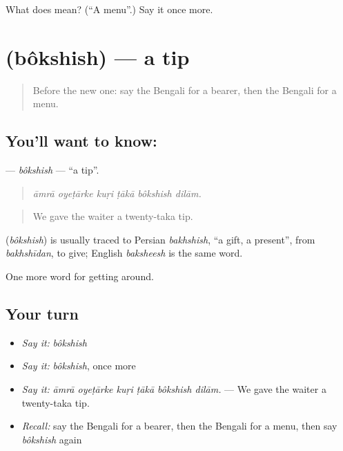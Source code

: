 \begin{tcolorbox}[breakable,colback=teal!4,colframe=teal!35!black,title={Before you move on}]
What does  mean? (\textquotedblleft{}A menu\textquotedblright{}.) Say it once more.
\end{tcolorbox}
\section[\texorpdfstring{\bn{বকশিশ} (bôkshish)}{বকশিশ (bôkshish)}]{ (bôkshish) — a tip}

\label{lesson:BN-C407-bokshish}



\begin{quote}
Before the new one: say the Bengali for a bearer, then the Bengali for a menu.
\end{quote}

\subsection*{You'll want to know: }
\textbf{} — \emph{bôkshish} — \textquotedblleft{}a tip\textquotedblright{}.

\begin{quote}
     
\end{quote}

\begin{quote}
\emph{āmrā oyeṭārke kuṛi ṭākā bôkshish dilām.}
\end{quote}

\begin{quote}
We gave the waiter a twenty-taka tip.
\end{quote}

\begin{cousinweb}
\textbf{} (\emph{bôkshish}) is usually traced to Persian \emph{bakhshish}, \textquotedblleft{}a gift, a present\textquotedblright{}, from \emph{bakhshīdan}, to give; English \emph{baksheesh} is the same word.
\end{cousinweb}

\begin{grammarlens}[title={What you've built}]
One more word for getting around.
\end{grammarlens}

\subsection*{Your turn}
\begin{itemize}
\raggedright
  \item \emph{Say it:} \emph{bôkshish}
  \item \emph{Say it:} \emph{bôkshish}, once more
  \item \emph{Say it:} \emph{āmrā oyeṭārke kuṛi ṭākā bôkshish dilām.} — We gave the waiter a twenty-taka tip.
  \item \emph{Recall:} say the Bengali for a bearer, then the Bengali for a menu, then say \emph{bôkshish} again
\end{itemize}

